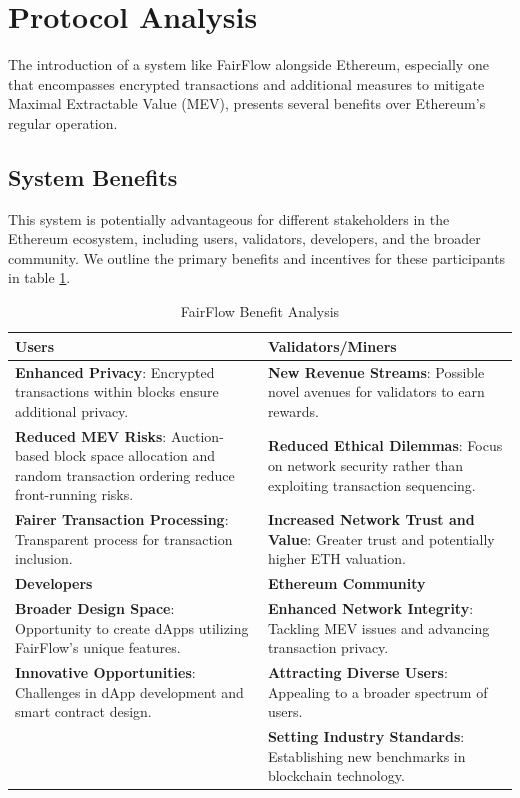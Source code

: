\documentclass{article}
\begin{document}
\section{Protocol Analysis}

The introduction of a system like FairFlow alongside Ethereum, especially one that encompasses encrypted transactions and additional measures to mitigate Maximal Extractable Value (MEV), presents several benefits over Ethereum's regular operation. 

\subsection{System Benefits}

This system is potentially advantageous for different stakeholders in the Ethereum ecosystem, including users, validators, developers, and the broader community. We outline the primary benefits and incentives for these participants in table \ref{table:fairflow}.

\begin{table}[h]
\centering
\begin{tabular}{ | m{6cm} | m{6cm} | }
\hline
\textbf{Users} & \textbf{Validators/Miners} \\
\hline
\textbf{Enhanced Privacy}: Encrypted transactions within blocks ensure additional privacy. & \textbf{New Revenue Streams}: Possible novel avenues for validators to earn rewards. \\
\textbf{Reduced MEV Risks}: Auction-based block space allocation and random transaction ordering reduce front-running risks. & \textbf{Reduced Ethical Dilemmas}: Focus on network security rather than exploiting transaction sequencing. \\
\textbf{Fairer Transaction Processing}: Transparent process for transaction inclusion. & \textbf{Increased Network Trust and Value}: Greater trust and potentially higher ETH valuation. \\
\hline
\textbf{Developers} & \textbf{Ethereum Community} \\
\hline
\textbf{Broader Design Space}: Opportunity to create dApps utilizing FairFlow's unique features. & \textbf{Enhanced Network Integrity}: Tackling MEV issues and advancing transaction privacy. \\
\textbf{Innovative Opportunities}: Challenges in dApp development and smart contract design. & \textbf{Attracting Diverse Users}: Appealing to a broader spectrum of users. \\
& \textbf{Setting Industry Standards}: Establishing new benchmarks in blockchain technology. \\
\hline
\end{tabular}
\caption{FairFlow Benefit Analysis}
\label{table:fairflow}
\end{table}
\end{document}
